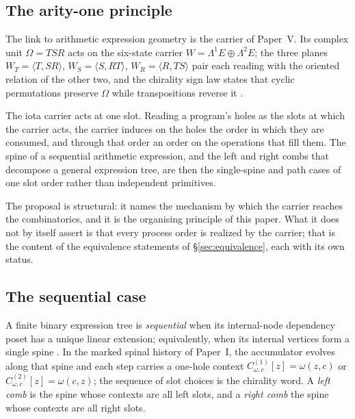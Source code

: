 \subsection{The arity-one principle}

The link to arithmetic expression geometry is the carrier of Paper~V.  Its complex
unit $\Omega=TSR$ acts on the six-state carrier
$W=\Lambda^{1}E\oplus\Lambda^{2}E$; the three planes
$W_T=\langle T,SR\rangle$, $W_S=\langle S,RT\rangle$, $W_R=\langle R,TS\rangle$ pair
each reading with the oriented relation of the other two, and the chirality sign law
states that cyclic permutations preserve $\Omega$ while transpositions reverse it
\cite{Yuan2026AEGPaperFive}.

\begin{proposal}\label{prop:arity-one}
The iota carrier acts at one slot.  Reading a program's holes as the slots at which
the carrier acts, the carrier induces on the holes the order in which they are
consumed, and through that order an order on the operations that fill them.  The
spine of a sequential arithmetic expression, and the left and right combs that
decompose a general expression tree, are then the single-spine and path cases of one
slot order rather than independent primitives.
\end{proposal}

The proposal is structural: it names the mechanism by which the carrier reaches the
combinatorics, and it is the organising principle of this paper.  What it does not by
itself assert is that every process order is realized by the carrier; that is the
content of the equivalence statements of \S\ref{sec:equivalence}, each with its own
status.

\subsection{The sequential case}

\begin{definition}\label{def:spine-combs}
A finite binary expression tree is \emph{sequential} when its internal-node
dependency poset has a unique linear extension; equivalently, when its internal
vertices form a single spine \cite{Yuan2026AEGFoundations}.  In the marked spinal
history of Paper~I, the accumulator evolves along that spine and each step carries a
one-hole context $C_{\omega,c}^{(1)}[z]=\omega(z,c)$ or
$C_{\omega,c}^{(2)}[z]=\omega(c,z)$; the sequence of slot choices is the chirality
word.  A \emph{left comb} is the spine whose contexts are all left slots, and a
\emph{right comb} the spine whose contexts are all right slots.
\end{definition}

